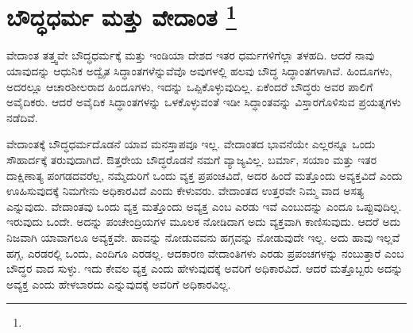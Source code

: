 
\chapter[ಬೌದ್ಧಧರ್ಮ ಮತ್ತು ವೇದಾಂತ ]{ಬೌದ್ಧಧರ್ಮ ಮತ್ತು ವೇದಾಂತ \protect\footnote{}}

ವೇದಾಂತ ತತ್ತ್ವವೇ ಬೌದ್ಧಧರ್ಮಕ್ಕೆ ಮತ್ತು ಇಂಡಿಯಾ ದೇಶದ ಇತರ ಧರ್ಮಗಳಿಗೆಲ್ಲಾ ತಳಹದಿ. ಆದರೆ ನಾವು ಯಾವುದನ್ನು ಆಧುನಿಕ ಅದ್ವೈತ ಸಿದ್ಧಾಂತಗಳೆನ್ನುವೆವೊ ಅವುಗಳಲ್ಲಿ ಹಲವು ಬೌದ್ಧ ಸಿದ್ಧಾಂತಗಳಾಗಿವೆ. ಹಿಂದೂಗಳು, ಅದರಲ್ಲೂ ಆಚಾರಶೀಲರಾದ ಹಿಂದೂಗಳು, ಇದನ್ನು ಒಪ್ಪಿಕೊಳ್ಳುವುದಿಲ್ಲ. ಏಕೆಂದರೆ ಬೌದ್ಧರು ಅವರ ಪಾಲಿಗೆ ಅವೈದಿಕರು. ಆದರೆ ಅವೈದಿಕ ಸಿದ್ಧಾಂತಗಳನ್ನು ಒಳಕೊಳ್ಳುವಂತೆ ಇಡೀ ಸಿದ್ಧಾಂತವನ್ನು ವಿಸ್ತಾರಗೊಳಿಸುವ ಪ್ರಯತ್ನಗಳು ನಡೆದಿವೆ.

ವೇದಾಂತಕ್ಕೆ ಬೌದ್ಧಧರ್ಮದೊಡನೆ ಯಾವ ಮನಸ್ತಾಪವೂ ಇಲ್ಲ. ವೇದಾಂತದ ಭಾವನೆಯೇ ಎಲ್ಲರನ್ನೂ ಒಂದು ಸೌಹಾರ್ದಕ್ಕೆ ತರುವುದಾಗಿದೆ. ಔತ್ತರೇಯ ಬೌದ್ಧರೊಡನೆ ನಮಗೆ ವ್ಯಾಜ್ಯವಿಲ್ಲ. ಬರ್ಮಾ, ಸಯಾಂ ಮತ್ತು ಇತರ ದಾಕ್ಷಿಣಾತ್ಯ ಪಂಗಡದವರೆಲ್ಲ, ನಮ್ಮೆದುರಿಗೆ ಒಂದು ವ್ಯಕ್ತ ಪ್ರಪಂಚವಿದೆ, ಅದರ ಹಿಂದೆ ಮತ್ತೊಂದು ಅವ್ಯಕ್ತವಿದೆ ಎಂದು ಊಹಿಸುವುದಕ್ಕೆ ನಿಮಗೇನು ಅಧಿಕಾರವಿದೆ ಎಂದು ಕೇಳುವರು. ವೇದಾಂತದ ಉತ್ತರವೇ ನಿಮ್ಮ ವಾದ ಅಸತ್ಯ ಎನ್ನುವುದು. ವೇದಾಂತವು ಒಂದು ವ್ಯಕ್ತ ಮತ್ತೊಂದು ಅವ್ಯಕ್ತ ಎಂಬ ಎರಡು ಇವೆ ಎಂಬುದನ್ನು ಎಂದೂ ಒಪ್ಪುವುದಿಲ್ಲ. ಇರುವುದು ಒಂದೇ. ಅದನ್ನು ಪಂಚೇಂದ್ರಿಯಗಳ ಮೂಲಕ ನೋಡಿದಾಗ ಅದು ವ್ಯಕ್ತವಾಗಿ ಕಾಣಿಸುವುದು. ಆದರೆ ಅದು ನಿಜವಾಗಿ ಯಾವಾಗಲೂ ಅವ್ಯಕ್ತವೇ. ಹಾವನ್ನು ನೋಡುವವನು ಹಗ್ಗವನ್ನು ನೋಡುವುದೇ ಇಲ್ಲ. ಅದು ಹಾವು ಇಲ್ಲವೆ ಹಗ್ಗ, ಎರಡರಲ್ಲಿ ಒಂದು, ಎಂದಿಗೂ ಎರಡಲ್ಲ. ಆದಕಾರಣ ವೇದಾಂತಿಗಳು ಎರಡು ಪ್ರಪಂಚಗಳನ್ನು ನಂಬುತ್ತಾರೆ ಎಂಬ ಬೌದ್ಧರ ವಾದ ಸುಳ್ಳು. ಇದು ಕೇವಲ ವ್ಯಕ್ತ ಎಂದು ಹೇಳುವುದಕ್ಕೆ ಅವರಿಗೆ ಅಧಿಕಾರವಿದೆ. ಆದರೆ ಮತ್ತೊಬ್ಬರು ಅದನ್ನು ಅವ್ಯಕ್ತ ಎಂದು ಹೇಳಬಾರದು ಎನ್ನುವುದಕ್ಕೆ ಅವರಿಗೆ ಅಧಿಕಾರವಿಲ್ಲ.

